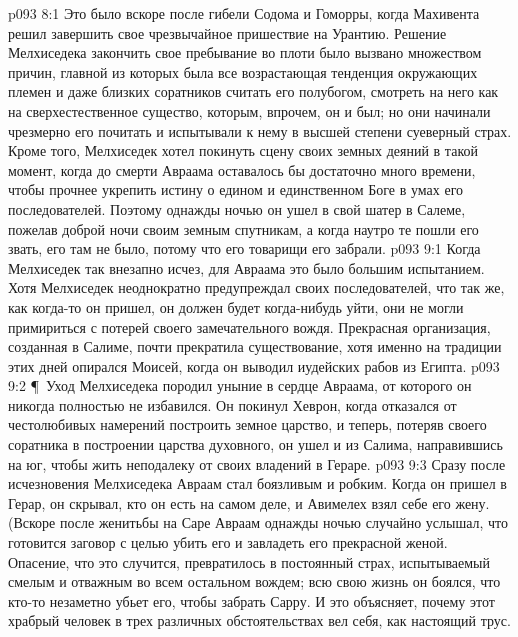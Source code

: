 \vs p093 8:1 Это было вскоре после гибели Содома и Гоморры, когда Махивента решил завершить свое чрезвычайное пришествие на Урантию. Решение Мелхиседека закончить свое пребывание во плоти было вызвано множеством причин, главной из которых была все возрастающая тенденция окружающих племен и даже близких соратников считать его полубогом, смотреть на него как на сверхестественное существо, которым, впрочем, он и был; но они начинали чрезмерно его почитать и испытывали к нему в высшей степени суеверный страх. Кроме того, Мелхиседек хотел покинуть сцену своих земных деяний в такой момент, когда до смерти Авраама оставалось бы достаточно много времени, чтобы прочнее укрепить истину о едином и единственном Боге в умах его последователей. Поэтому однажды ночью он ушел в свой шатер в Салеме, пожелав доброй ночи своим земным спутникам, а когда наутро те пошли его звать, его там не было, потому что его товарищи его забрали.
\vs p093 9:1 Когда Мелхиседек так внезапно исчез, для Авраама это было большим испытанием. Хотя Мелхиседек неоднократно предупреждал своих последователей, что так же, как когда\hyp{}то он пришел, он должен будет когда\hyp{}нибудь уйти, они не могли примириться с потерей своего замечательного вождя. Прекрасная организация, созданная в Салиме, почти прекратила существование, хотя именно на традиции этих дней опирался Моисей, когда он выводил иудейских рабов из Египта.
\vs p093 9:2 \P\ Уход Мелхиседека породил уныние в сердце Авраама, от которого он никогда полностью не избавился. Он покинул Хеврон, когда отказался от честолюбивых намерений построить земное царство, и теперь, потеряв своего соратника в построении царства духовного, он ушел и из Салима, направившись на юг, чтобы жить неподалеку от своих владений в Гераре.
\vs p093 9:3 Сразу после исчезновения Мелхиседека Авраам стал боязливым и робким. Когда он пришел в Герар, он скрывал, кто он есть на самом деле, и Авимелех взял себе его жену. (Вскоре после женитьбы на Саре Авраам однажды ночью случайно услышал, что готовится заговор с целью убить его и завладеть его прекрасной женой. Опасение, что это случится, превратилось в постоянный страх, испытываемый смелым и отважным во всем остальном вождем; всю свою жизнь он боялся, что кто\hyp{}то незаметно убьет его, чтобы забрать Сарру. И это объясняет, почему этот храбрый человек в трех различных обстоятельствах вел себя, как настоящий трус.
